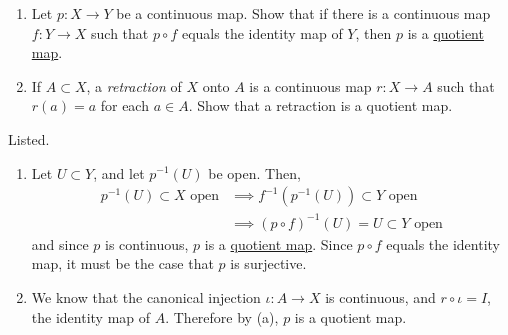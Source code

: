   \begin{exercise}[Munkres 22.2]
    \begin{enumerate}
      \item[(a)] Let $p : X \to Y$ be a continuous map. Show that if there is a continuous map
        $f : Y \to X$ such that $p \circ f$ equals the identity map of $Y$, then $p$ is a \hyperref[def:quotient-map]{quotient
        map}.
      
      \item[(b)] If $A \subset X$, a \textit{retraction} of $X$ onto $A$ is a continuous map $r : X \to A$ such
        that $r(a) = a$ for each $a \in A$. Show that a retraction is a quotient map.
    \end{enumerate}
  \end{exercise}
  \begin{solution}
     Listed. 
     \begin{enumerate}
       \item Let $U \subset Y$, and let $p^{-1}(U)$ be open. Then, 
       \begin{align}
         p^{-1} (U) \subset X \text{ open} & \implies f^{-1} (p^{-1}(U)) \subset Y \text{ open} \\
                                           & \implies (p \circ f)^{-1} (U) = U \subset Y \text{ open}
       \end{align}
       and since $p$ is continuous, $p$ is a \hyperref[def:quotient-map]{quotient map}. Since $p \circ f$ equals the identity map, it must be the case that $p$ is surjective. 

       \item We know that the canonical injection $\iota: A \rightarrow X$ is continuous, and $r \circ \iota = I$, the identity map of $A$. Therefore by (a), $p$ is a quotient map. 
     \end{enumerate}
  \end{solution}

